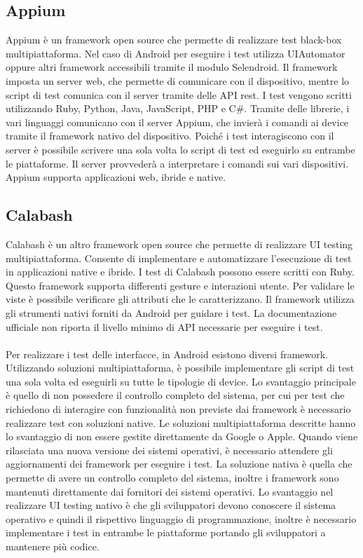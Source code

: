 \documentclass[12pt]{report}
\begin{document}
\subsection{Appium}
Appium è un framework open source che permette di realizzare test black-box multipiattaforma. Nel caso di Android per eseguire i test utilizza UIAutomator oppure altri framework accessibili tramite il modulo Selendroid. Il framework imposta un server web, che permette di comunicare con il dispositivo, mentre lo script di test comunica con il server tramite delle API rest. I test vengono scritti utilizzando Ruby, Python, Java, JavaScript, PHP e C\#. Tramite delle librerie, i vari linguaggi comunicano con il server Appium, che invierà i comandi ai device tramite il framework nativo del dispositivo. Poiché i test interagiscono con il server è possibile scrivere una sola volta lo script di test ed eseguirlo su entrambe le piattaforme. Il server provvederà a interpretare i comandi sui vari dispositivi. Appium supporta applicazioni web, ibride e native.
\subsection{Calabash}
Calabash è un altro framework open source che permette di realizzare UI testing multipiattaforma. Consente di implementare e automatizzare l'esecuzione di test in applicazioni native e ibride. I test di Calabash possono essere scritti con Ruby. Questo framework supporta differenti gesture e interazioni utente. Per validare le viste è possibile verificare gli attributi che le caratterizzano. Il framework utilizza gli strumenti nativi forniti da Android per guidare i test. La documentazione ufficiale non riporta il livello minimo di API necessarie per eseguire i test.
\\

\\
Per realizzare i test delle interfacce, in Android esistono diversi framework. Utilizzando soluzioni multipiattaforma, è possibile implementare gli script di test una sola volta ed eseguirli su tutte le tipologie di device. Lo svantaggio principale è quello di non possedere il controllo completo del sistema, per cui per test che richiedono di interagire con funzionalità non previste dai framework è necessario realizzare test con soluzioni native. Le soluzioni multipiattaforma descritte hanno lo svantaggio di non essere gestite direttamente da Google o Apple. Quando viene rilasciata una nuova versione dei sistemi operativi, è necessario attendere gli aggiornamenti dei framework per eseguire i test. La soluzione nativa è quella che permette di avere un controllo completo del sistema, inoltre i framework sono mantenuti direttamente dai fornitori dei sistemi operativi.
Lo svantaggio nel realizzare UI testing nativo è che gli sviluppatori devono conoscere il sistema operativo e quindi il rispettivo linguaggio di programmazione, inoltre  è necessario implementare i test in entrambe le piattaforme portando gli sviluppatori a mantenere più codice.
\end{document}
